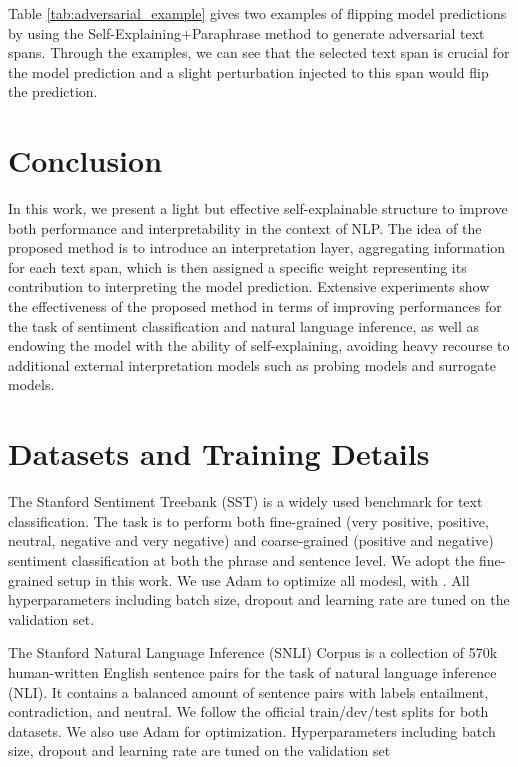 \documentclass[11pt,a4paper]{article}
\begin{document}
Table \ref{tab:adversarial_example} gives two examples of flipping model predictions by using the Self-Explaining+Paraphrase method to generate adversarial text spans. Through the examples, we can see that the selected text span is crucial for the model prediction and a slight perturbation injected to this span would flip the prediction.

\section{Conclusion}
In this work, we present a light but effective self-explainable structure to improve both performance and interpretability in the context of NLP.  The idea of the proposed method is to introduce an interpretation layer, aggregating information for each text span, which is then assigned a specific weight representing its contribution to interpreting  the model prediction. Extensive experiments show the effectiveness of the proposed method in terms of improving performances for the task of sentiment classification and natural language inference, as well as endowing the model with the ability of self-explaining, avoiding heavy recourse to additional external interpretation models such as probing models and surrogate models. 





\appendix

\section{Datasets and Training Details}
The Stanford Sentiment Treebank (SST) \citep{socher2013recursive} is a widely used benchmark for text classification. The task is to perform both fine-grained (very positive, positive, neutral, negative and very negative) and coarse-grained (positive and negative) sentiment classification at both the phrase and sentence level. We adopt the fine-grained setup in this work. We use Adam \citep{kingma2014adam} to optimize all modesl, with . All hyperparameters including batch size, dropout and learning rate are tuned on the validation set.

The Stanford Natural Language Inference (SNLI) Corpus \citep{bowman2015large} is a collection of 570k human-written English sentence pairs for the task of natural language inference (NLI). It contains a balanced amount of sentence pairs with  labels entailment, contradiction, and neutral. We follow the official train/dev/test splits for both datasets. We also use Adam \citep{kingma2014adam} for optimization. 
Hyperparameters including batch size, dropout and learning rate are tuned on the validation set 
\end{document}
